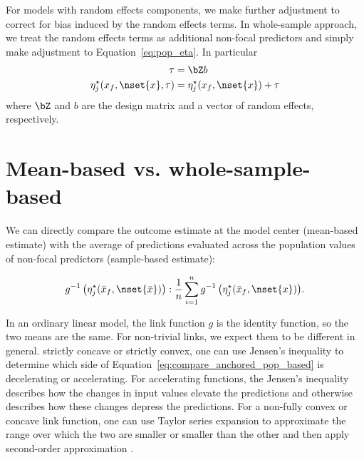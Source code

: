 For models with random effects components, we make further adjustment to correct for bias induced by the random effects terms. In whole-sample approach, we treat the random effects terms as additional non-focal predictors and simply make adjustment to Equation~\ref{eq:pop_eta}. In particular
%
\begin{align}\label{eq:pop_eta_re} 
\tau &= \bZ b \nonumber \\
\eta_j^\star(x_f, \nset{x}, \tau)  &= \eta_j^\star(x_f, \nset{x}) + \tau
\end{align}
where $\bZ$ and $b$ are the design matrix and a vector of random effects, respectively.

\section{Mean-based vs. whole-sample-based}


We can directly compare the outcome estimate at the model center (mean-based estimate) with the average of predictions evaluated across the population values of non-focal predictors (sample-based estimate):

\begin{align}\label{eq:compare_anchored_pop_based}
g^{-1} \left(\eta_j^\star(\bar{x}_f, \nset{\bar{x}})\right) : \frac{1}{n} \sum_{i=1}^n{ g^{-1} \left(\eta_j^\star(\bar{x}_f, \nset{x})\right)}.
\end{align}

In an ordinary linear model, the link function $g$ is the identity function, so the two means are the same. For non-trivial links, we expect them to be different in general. 
strictly concave or strictly convex, one can use Jensen's inequality to determine which side of Equation~\ref{eq:compare_anchored_pop_based} is decelerating or accelerating. For accelerating functions, the Jensen’s inequality describes how the changes in input values elevate the predictions and otherwise describes how these changes depress the predictions. For a non-fully convex or concave link function, one can use Taylor series expansion to approximate the range over which the two are smaller or smaller than the other and then apply second-order approximation \citep{hanmer2013behind}.

